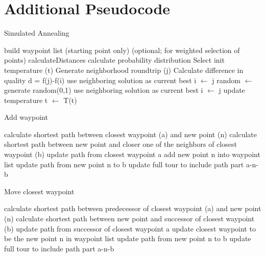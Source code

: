 \section{Additional Pseudocode}


\begin{breakablealgorithm}
	\caption{Simulated Annealing}
	\label{alg:SAImplementation}
	\begin{algorithmic}[1]
		\STATE build waypoint list (starting point only)
		\STATE (optional; for weighted selection of points) calculateDistances
		\STATE calculate probability distribution
		\STATE Select init temperature (t)
		\STATE Generate neighborhood roundtrip (j)
		\STATE Calculate difference in quality d = f(j)-f(i)
		\STATE use neighboring solution as current best i $\gets$ j
		\ELSE 
		\STATE random $\gets$ generate random(0,1)
		\STATE use neighboring solution as current best i $\gets$ j
		\ENDIF
		\ENDIF
		\ENDFOR
		\STATE update temperature t $\gets$ T(t)
		\ENDFOR
	\end{algorithmic}
\end{breakablealgorithm}



\begin{breakablealgorithm}
	\caption{Add waypoint}
	\label{alg:SAGenerateNeigborhoodAdd}
	\begin{algorithmic}[1]
		\STATE calculate shortest path between closest waypoint (a) and new point (n)
		\STATE calculate shortest path between new point and closer one of the neighbors of closest waypoint (b)
		\STATE update path from closest waypoint a
		\STATE add new point n into waypoint list
		\STATE update path from new point n to b
		\STATE update full tour to include path part a-n-b
	\end{algorithmic}
\end{breakablealgorithm}

\begin{breakablealgorithm}
	\caption{Move closest waypoint}
	\label{alg:SAGenerateNeigborhoodMove}
	\begin{algorithmic}[1]
		\STATE calculate shortest path between predecessor of closest waypoint (a) and new point (n)
		\STATE calculate shortest path between new point and successor of closest waypoint (b)
		\STATE update path from successor of closest waypoint a
		\STATE update closest waypoint to be the new point n in waypoint list
		\STATE update path from new point n to b
		\STATE update full tour to include path part a-n-b
	\end{algorithmic}
\end{breakablealgorithm}

